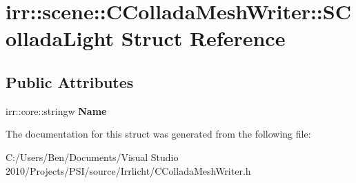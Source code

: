 \hypertarget{structirr_1_1scene_1_1_c_collada_mesh_writer_1_1_s_collada_light}{\section{irr\-:\-:scene\-:\-:C\-Collada\-Mesh\-Writer\-:\-:S\-Collada\-Light Struct Reference}
\label{structirr_1_1scene_1_1_c_collada_mesh_writer_1_1_s_collada_light}
}
\subsection*{Public Attributes}
\begin{DoxyCompactItemize}
\item 
\hypertarget{structirr_1_1scene_1_1_c_collada_mesh_writer_1_1_s_collada_light_aea88589512c50b38d79f14f75d524f28}{irr\-::core\-::stringw {\bfseries Name}}\label{structirr_1_1scene_1_1_c_collada_mesh_writer_1_1_s_collada_light_aea88589512c50b38d79f14f75d524f28}

\end{DoxyCompactItemize}


The documentation for this struct was generated from the following file\-:\begin{DoxyCompactItemize}
\item 
C\-:/\-Users/\-Ben/\-Documents/\-Visual Studio 2010/\-Projects/\-P\-S\-I/source/\-Irrlicht/C\-Collada\-Mesh\-Writer.\-h\end{DoxyCompactItemize}
